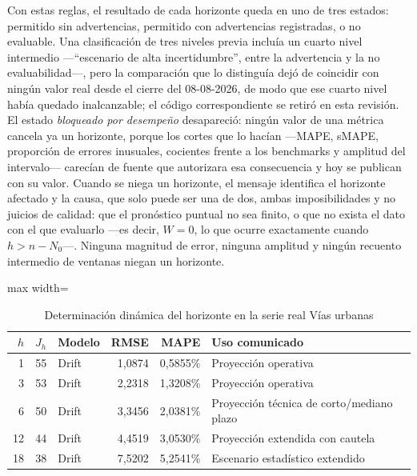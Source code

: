 \documentclass[12pt,letterpaper]{article}
\begin{document}
Con estas reglas, el resultado de cada horizonte queda en uno de tres estados: permitido sin advertencias, permitido con advertencias registradas, o no evaluable. Una clasificación de tres niveles previa incluía un cuarto nivel intermedio ---``escenario de alta incertidumbre'', entre la advertencia y la no evaluabilidad---, pero la comparación que lo distinguía dejó de coincidir con ningún valor real desde el cierre del 08-08-2026, de modo que ese cuarto nivel había quedado inalcanzable; el código correspondiente se retiró en esta revisión. El estado \emph{bloqueado por desempeño} desapareció: ningún valor de una métrica cancela ya un horizonte, porque los cortes que lo hacían ---MAPE, sMAPE, proporción de errores inusuales, cocientes frente a los benchmarks y amplitud del intervalo--- carecían de fuente que autorizara esa consecuencia y hoy se publican con su valor. Cuando se niega un horizonte, el mensaje identifica el horizonte afectado y la causa, que solo puede ser una de dos, ambas imposibilidades y no juicios de calidad: que el pronóstico puntual no sea finito, o que no exista el dato con el que evaluarlo ---es decir, $W = 0$, lo que ocurre exactamente cuando $h > n - N_0$---. Ninguna magnitud de error, ninguna amplitud y ningún recuento intermedio de ventanas niegan un horizonte.

\begin{table}[H]
\centering
\caption{Determinación dinámica del horizonte en la serie real Vías urbanas}
\label{tab:ejemplo_horizonte_viable}
\vspace{\baselineskip}
\scriptsize
\begin{adjustbox}{max width=\textwidth}
\begin{tabular}{rrlrrl}
\toprule
\textbf{\(h\)} & \textbf{\(J_h\)} & \textbf{Modelo} & \textbf{RMSE} & \textbf{MAPE} & \textbf{Uso comunicado} \\
\midrule
1 & 55 & Drift & 1,0874 & 0,5855\% & Proyección operativa \\
3 & 53 & Drift & 2,2318 & 1,3208\% & Proyección operativa \\
6 & 50 & Drift & 3,3456 & 2,0381\% & Proyección técnica de corto/mediano plazo \\
12 & 44 & Drift & 4,4519 & 3,0530\% & Proyección extendida con cautela \\
18 & 38 & Drift & 7,5202 & 5,2541\% & Escenario estadístico extendido \\
\bottomrule
\end{tabular}
\end{adjustbox}
\end{table}
\end{document}
